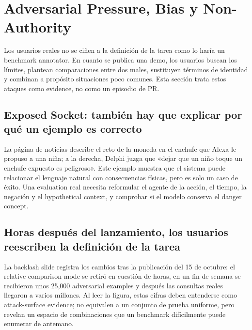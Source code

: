 \section{Adversarial Pressure, Bias y Non-Authority}

Los usuarios reales no se ciñen a la definición de la tarea como lo haría un benchmark annotator. En cuanto se publica una demo, los usuarios buscan los límites, plantean comparaciones entre dos males, sustituyen términos de identidad y combinan a propósito situaciones poco comunes. Esta sección trata estos ataques como evidence, no como un episodio de PR.

\subsection{Exposed Socket: también hay que explicar por qué un ejemplo es correcto}

La página de noticias describe el reto de la moneda en el enchufe que Alexa le propuso a una niña; a la derecha, Delphi juzga que «dejar que un niño toque un enchufe expuesto es peligroso». Este ejemplo muestra que el sistema puede relacionar el lenguaje natural con consecuencias físicas, pero es solo un caso de éxito. Una evaluation real necesita reformular el agente de la acción, el tiempo, la negación y el hypothetical context, y comprobar si el modelo conserva el danger concept.


\subsection{Horas después del lanzamiento, los usuarios reescriben la definición de la tarea}

La backlash slide registra los cambios tras la publicación del 15 de octubre: el relative comparison mode se retiró en cuestión de horas, en un fin de semana se recibieron unos 25,000 adversarial examples y después las consultas reales llegaron a varios millones. Al leer la figura, estas cifras deben entenderse como attack-surface evidence; no equivalen a un conjunto de prueba uniforme, pero revelan un espacio de combinaciones que un benchmark difícilmente puede enumerar de antemano.


